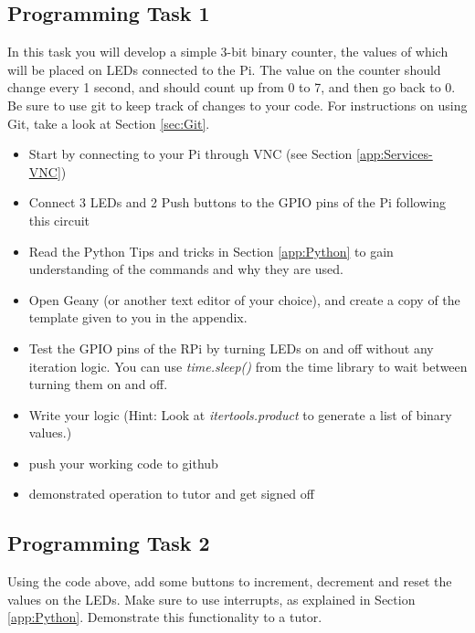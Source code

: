 \subsection{Programming Task 1}
In this task you will develop a simple 3-bit binary counter, the values of which will be placed on LEDs connected to the Pi. The value on the counter should change every 1 second, and should count up from 0 to 7, and then go back to 0.
Be sure to use git to keep track of changes to your code. For instructions on using Git, take a look at Section \ref{sec:Git}.
\begin{itemize}
    \item Start by connecting to your Pi through VNC (see Section \ref{app:Services-VNC})
    \item Connect 3 LEDs and 2 Push buttons to the GPIO pins of the Pi following this circuit
    \item Read the Python Tips and tricks in Section \ref{app:Python} to gain understanding of the commands and why they are used.
    \item Open Geany (or another text editor of your choice), and create a copy of the template given to you in the appendix.
    \item Test the GPIO pins of the RPi by turning LEDs on and off without any iteration logic. You can use \textit{time.sleep()} from the time library to wait between turning them on and off.
    \item Write your logic (Hint: Look at \textit{itertools.product} to generate a list of binary values.)
    \item push your working code to github
    \item demonstrated operation to tutor and get signed off
\end{itemize}

\subsection{Programming Task 2}
Using the code above, add some buttons to increment, decrement and reset the values on the LEDs. Make sure to use interrupts, as explained in Section \ref{app:Python}. Demonstrate this functionality to a tutor.

